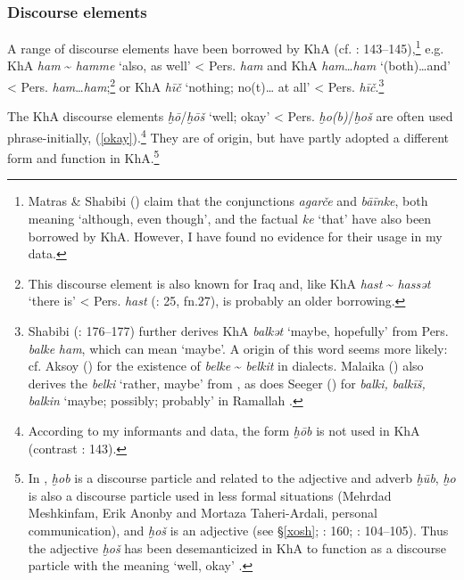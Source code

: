 \documentclass[output=paper,nonflat]{langsci/langscibook}
\begin{document}

\subsubsection{Discourse elements}

A range of  discourse elements have been borrowed by KhA (cf. \citealt{MatrasShabibi2007}: 143–145),\footnote{Matras \& Shabibi (\citeyear[144]{MatrasShabibi2007}) claim that the  conjunctions \textit{agarče} and \textit{bāīnke}, both meaning ‘although, even though’, and the  factual  \textit{ke} ‘that’ have also been borrowed by KhA. However, I have found no evidence for their usage in my data.} e.g. KhA \textit{ham} \~{} \textit{hamme} ‘also, as well’ < Pers. \textit{ham} and KhA \textit{ham}…\textit{ham} ‘(both)…and’ < Pers. \textit{ham}…\textit{ham};\footnote{This discourse element is also known for Iraq \citep[36]{Malaika1963} and, like KhA \textit{hast} \~{} \textit{hassət} ‘there is’ < Pers. \textit{hast} (\citealt{Ingham1973}: 25, fn.27), is probably an older borrowing.} or KhA \textit{hīč} ‘nothing; no(t)… at all’ < Pers. \textit{hīč}.\footnote{Shabibi (\citeyear{Shabibi2006}: 176–177) further derives KhA \textit{balkət} ‘maybe, hopefully’ from Pers. \textit{balke} \textit{ham}, which can mean ‘maybe’. A  origin of this word seems more likely: cf. Aksoy (\citeyear[620]{Aksoy1963}) for the existence of \textit{belke} \~{} \textit{belkit} in   dialects. Malaika (\citeyear[35]{Malaika1963}) also derives the   \textit{belki} ‘rather, maybe’ from , as does Seeger (\citeyear[28]{Seeger2009}) for \textit{balki,} \textit{balkīš,} \textit{balkin} ‘maybe; possibly; probably’ in Ramallah .} 

The KhA discourse elements \textit{ḫō}/\textit{ḫōš} ‘well; okay’ < Pers. \textit{ḫo(b)}/\textit{ḫoš} are often used phrase-initially, (\ref{okay}).\footnote{According to my informants and data, the form \textit{ḫōb} is not used in KhA (contrast \citealt{MatrasShabibi2007}: 143).} They are of  origin, but have partly adopted a different form and function in KhA.\footnote{In , \textit{ḫob} is a discourse particle and related to the adjective and adverb \textit{ḫūb}, \textit{ḫo} is also a discourse particle used in less formal situations (Mehrdad Meshkinfam, Erik Anonby and Mortaza Taheri-Ardali, personal communication), and \textit{ḫoš} is an adjective (see §\ref{xosh}; \citealt{Shabibi2006}: 160; \citealt{Mohammadi2018}: 104--105). Thus the  adjective \textit{ḫoš} has been desemanticized in KhA to function as a discourse particle with the meaning ‘well, okay’ \citep[160]{Shabibi2006}.}
\end{document}

